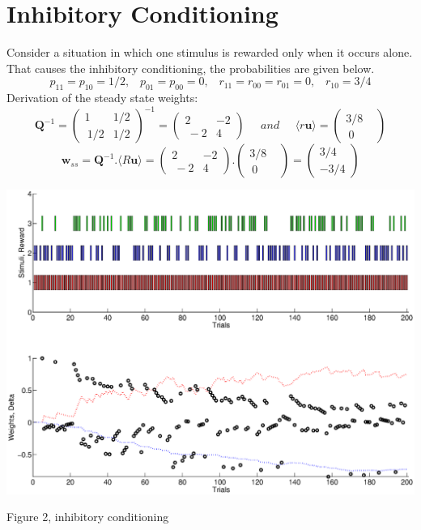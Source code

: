 \documentclass{article}
\begin{document}
\section{Inhibitory Conditioning}
Consider a situation in which one stimulus is rewarded only when it occurs alone. That causes the inhibitory conditioning, the probabilities are given below.
\begin{equation*}
 p_{11}=p_{10}=1/2, \;\;\; p_{01}=p_{00}=0,\;\;\;r_{11}=r_{00}=r_{01}=0, \;\;\; r_{10}=3/4
\end{equation*}
Derivation of the steady state weights:
\begin{equation*}
\textbf{Q}^{-1}= \left ( \begin{array}{cc}  1 & 1/2 \\ \ 1/2 & 1/2  \end{array} \right )^{-1}=\left ( \begin{array}{cc}  2 & -2 \\ \ -2 & 4  \end{array} \right )  \;\;\;\;\; and \;\;\;\;\; \langle r \textbf{u} \rangle= \left ( \begin{array}{cc}  3/8  \\ \ 0 &  \end{array} \right )
\end{equation*}
\begin{equation*}
\textbf{w}_{ss}= \textbf{Q}^{-1}.\langle R\textbf{u} \rangle= \left ( \begin{array}{cc}  2 & -2 \\ \ -2 & 4  \end{array} \right ) . \left ( \begin{array}{cc}  3/8  \\ \ 0 &  \end{array} \right )=\left ( \begin{array}{cc}  3/4 \\ -3/4   \end{array} \right ) 
\end{equation*}
\begin{center}
\includegraphics[width=\textwidth]{inhib.eps}
\begin{footnotesize}
 Figure 2, inhibitory conditioning
\end{footnotesize}
\end{center}
\end{document}
